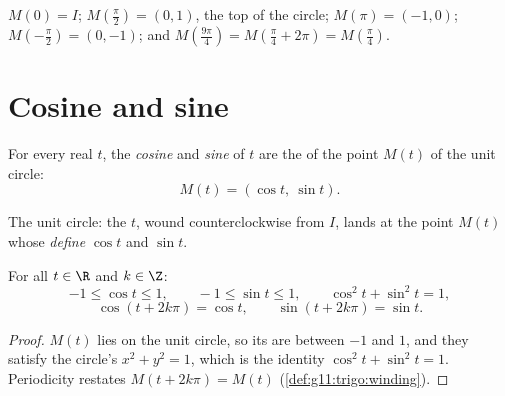 \begin{example}
$M(0) = I$; $M\!\left(\frac{\pi}{2}\right) = (0, 1)$, the top of the
circle; $M(\pi) = (-1, 0)$; $M\!\left(-\frac{\pi}{2}\right) = (0, -1)$;
and $M\!\left(\frac{9\pi}{4}\right) = M\!\left(\frac{\pi}{4} +
2\pi\right) = M\!\left(\frac{\pi}{4}\right)$.
\end{example}

\section{Cosine and sine}

\begin{definition}\label{def:g11:trigo:cossin}
For every real $t$, the \emph{cosine} and
\emph{sine} of $t$ are the  of the point $M(t)$ of
the unit circle:
\[
M(t) = (\cos t,\ \sin t).
\]
\end{definition}

\begin{omfigure}

{\small The unit circle: the  $t$, wound counterclockwise from
$I$, lands at the point $M(t)$ whose  \emph{define} $\cos t$
and $\sin t$.}
\end{omfigure}

\begin{proposition}\label{prop:g11:trigo:first}
For all $t \in \R$ and $k \in \Z$:
\[
-1 \leq \cos t \leq 1, \qquad
-1 \leq \sin t \leq 1, \qquad
\cos^2 t + \sin^2 t = 1,
\]
\[
\cos(t + 2k\pi) = \cos t, \qquad \sin(t + 2k\pi) = \sin t .
\]
\end{proposition}

\begin{proof}
$M(t)$ lies on the unit circle, so its  are between $-1$ and
$1$, and they satisfy the circle's  $x^2 + y^2 = 1$, which is the
identity $\cos^2 t + \sin^2 t = 1$. Periodicity restates
$M(t + 2k\pi) = M(t)$ (\cref{def:g11:trigo:winding}).
\end{proof}

